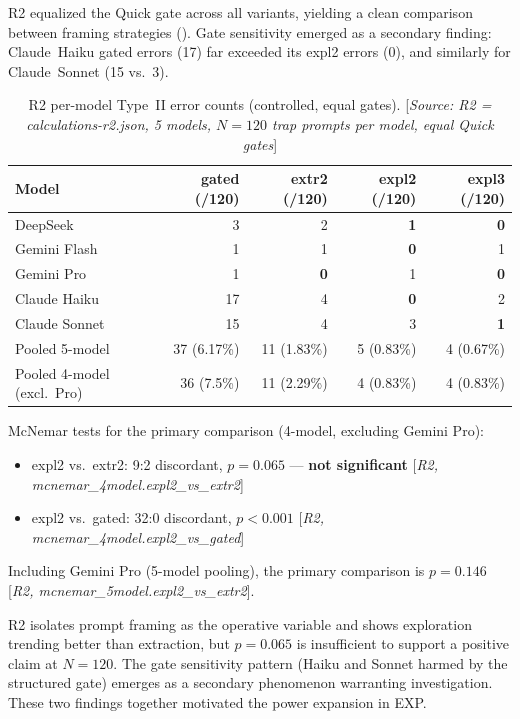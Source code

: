\documentclass[11pt,a4paper]{article}
\begin{document}
R2 equalized the Quick gate across all variants, yielding a clean comparison
between framing strategies ().  Gate sensitivity emerged as a
secondary finding: Claude~Haiku gated errors (17) far exceeded its \textsf{expl2}
errors (0), and similarly for Claude~Sonnet (15 vs.\ 3).

\begin{table}[htbp]
\centering
\caption{R2 per-model Type~II error counts (controlled, equal gates).
  [\emph{Source: R2 = calculations-r2.json, 5 models,
  $N = 120$ trap prompts per model, equal Quick gates}]}
\label{tab:r2}
\smallskip
\begin{tabular}{@{}lrrrr@{}}
\toprule
Model & \textsf{gated} (/120) & \textsf{extr2} (/120)
      & \textsf{expl2} (/120) & \textsf{expl3} (/120) \\
\midrule
DeepSeek       &  3 &  2 & \textbf{1}  & \textbf{0} \\
Gemini Flash   &  1 &  1 & \textbf{0}  &  1 \\
Gemini Pro     &  1 & \textbf{0} &  1 & \textbf{0} \\
Claude Haiku   & 17 &  4 & \textbf{0}  &  2 \\
Claude Sonnet  & 15 &  4 &  3          & \textbf{1} \\
\midrule
Pooled 5-model & 37 (6.17\%) & 11 (1.83\%) & 5 (0.83\%) & 4 (0.67\%) \\
Pooled 4-model (excl.\ Pro) & 36 (7.5\%) & 11 (2.29\%) & 4 (0.83\%) & 4 (0.83\%) \\
\bottomrule
\end{tabular}
\end{table}

\noindent McNemar tests for the primary comparison (4-model, excluding Gemini Pro):
\begin{itemize}[noitemsep]
  \item \textsf{expl2} vs.\ \textsf{extr2}: 9:2 discordant,
    $p = 0.065$ --- \textbf{not significant}
    [\emph{R2, mcnemar\_4model.expl2\_vs\_extr2}]
  \item \textsf{expl2} vs.\ \textsf{gated}: 32:0 discordant,
    $p < 0.001$ [\emph{R2, mcnemar\_4model.expl2\_vs\_gated}]
\end{itemize}

Including Gemini Pro (5-model pooling), the primary comparison is
$p = 0.146$ [\emph{R2, mcnemar\_5model.expl2\_vs\_extr2}].

R2 isolates prompt framing as the operative variable and shows exploration
trending better than extraction, but $p = 0.065$ is insufficient to support
a positive claim at $N = 120$.  The gate sensitivity pattern (Haiku and
Sonnet harmed by the structured gate) emerges as a secondary phenomenon
warranting investigation.  These two findings together motivated the power
expansion in EXP.
\end{document}
